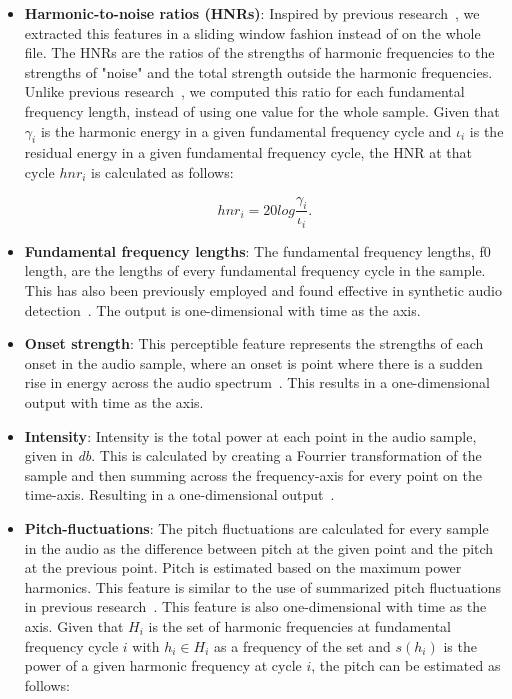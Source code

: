 \documentclass{article}
\begin{document}
\begin{itemize}
\item \textbf{Harmonic-to-noise ratios (HNRs)}: Inspired by previous research~\cite{chaiwongyen_contribution_2022,chaiwongyen_deepfake-speech_2023,		li_comparative_2022}, we extracted this features in a sliding window fashion instead of on the whole file. The HNRs are the ratios of the strengths of harmonic frequencies to the strengths of "noise" and the total strength outside the harmonic frequencies. Unlike previous research~\cite{chaiwongyen_contribution_2022, chaiwongyen_deepfake-speech_2023}, we computed this ratio for each fundamental frequency length, instead of using one value for the whole sample. Given that \(\gamma_{i}\) is the harmonic	energy in a given fundamental frequency cycle and \(\iota_{i}\) is the residual energy in a given fundamental frequency cycle, the HNR at that cycle \(hnr_{i}\) is calculated as follows:

\begin{equation}
    hnr_{i} = 20log\frac{\gamma_{i}}{\iota_{i}}.
\end{equation}

					

\item \textbf{Fundamental frequency lengths}: The fundamental frequency lengths, f0 length, are the lengths of every fundamental frequency cycle in the sample. This has also been previously employed and found effective in synthetic audio detection~\cite{xue_audio_2022}. The output is one-dimensional with time as the axis.

\item \textbf{Onset strength}: This perceptible feature represents the strengths of each onset in the audio sample, where an onset is point where there is a sudden rise in energy across the audio spectrum~\cite{li_comparative_2022}. This results in a one-dimensional output with time as the axis.

\item \textbf{Intensity}: Intensity is the total power at each point in the audio sample, given in \textit{db}. This is calculated by creating a Fourrier transformation of the sample and then summing across the frequency-axis for every point on the time-axis. Resulting in a one-dimensional output~\cite{li_comparative_2022}.

\item \textbf{Pitch-fluctuations}: The pitch fluctuations are calculated for every sample in the audio as the difference between pitch at the given point and the pitch at the previous point. Pitch is estimated based on the maximum power harmonics. This feature is similar to the use of summarized pitch fluctuations in previous research~\cite{khanjani_learning_2023}. This feature is also one-dimensional with time as the axis. Given that \(H_{i}\) is the set of harmonic frequencies at fundamental frequency cycle \(i\) with \(h_{i} \in H_{i}\) as a frequency of the set and \(s(h_{i})\) is the power of a given harmonic frequency at cycle \(i\), the pitch can be estimated as follows:
					                    

\end{itemize}
\end{document}
